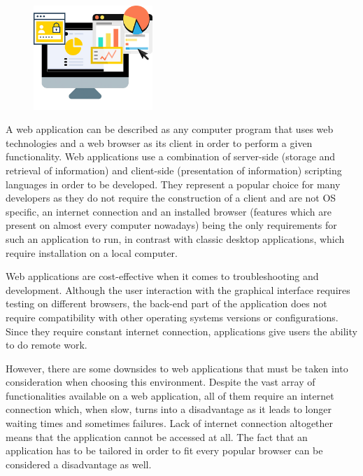 \documentclass{report}
\begin{document}
\begin{figure}
	\vspace*{-2cm}
    \centering
    \includegraphics[width=0.4\textwidth]{web}
	\vspace{-40pt} 
\end{figure}

A web application can be described as any computer program that uses web technologies and a web browser as its client in order to perform a given functionality. Web applications use a combination of server-side (storage and retrieval of information) and client-side (presentation of information) scripting languages in order to be developed. They represent a popular choice for many developers as they do not require the construction of a client and are not OS specific, an internet connection and an installed browser (features which are present on almost every computer nowadays) being the only requirements for such an application to run, in contrast with classic desktop applications, which require installation on a local computer. \par 

Web applications are cost-effective when it comes to troubleshooting and development. Although the user interaction with the graphical interface requires testing on different browsers, the back-end part of the application does not require compatibility with other operating systems versions or configurations. Since they require constant internet connection, applications give users the ability to do remote work. \par

However, there are some downsides to web applications that must be taken into consideration when choosing this environment. Despite the vast array of functionalities available on a web application, all of them require an internet connection which, when slow, turns into a disadvantage as it leads to longer waiting times and sometimes failures. Lack of internet connection altogether means that the application cannot be accessed at all. The fact that an application has to be tailored in order to fit every popular browser can be considered a disadvantage as well. \par
\end{document}
